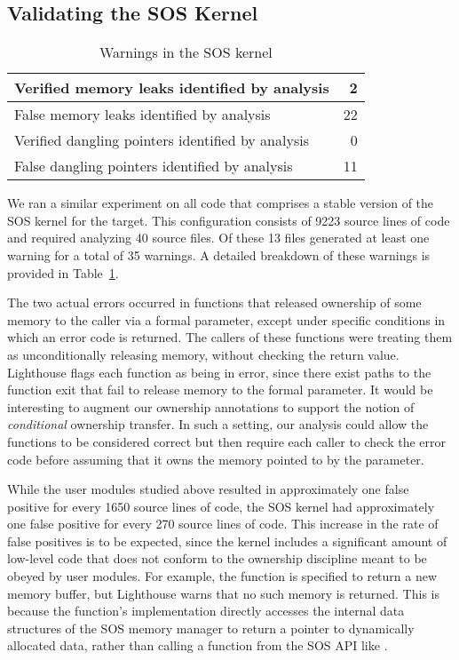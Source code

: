 \subsection{Validating the SOS Kernel}



\begin{table}
\caption{Warnings in the SOS kernel}
%
\label{tab:kernel}
\centering 
\begin{tabular}{| l | r |}
    \hline 
    Verified memory leaks identified by analysis & 2 \\
    \hline
    False memory leaks identified by analysis & 22 \\
    \hline 
    Verified dangling pointers identified by analysis & 0 \\
    \hline 
    False dangling pointers identified by analysis & 11 \\
    \hline 
\end{tabular} 
%
\end{table}


We ran a similar experiment on all code that comprises a stable version of
the SOS kernel for the  target.  
%
This configuration consists of 9223 source lines of code and required
analyzing 40 source files.  
%
Of these 13 files generated at least one warning for a total of 35
warnings.  
%
A detailed breakdown of these warnings is provided in
Table~\ref{tab:kernel}.



The two actual errors occurred in functions that released ownership of
some memory to the caller via a formal parameter, except under specific
conditions in which an error code is returned.
%
The callers of these functions were treating them as unconditionally
releasing memory, without checking the return value.  
%
Lighthouse flags each function as being in error, since there exist
paths to the function exit that fail to release memory to the formal
parameter.  
%
It would be interesting to augment our ownership annotations to support
the notion of {\em conditional} ownership transfer.  
%
In such a setting, our analysis could allow the functions to be
considered correct but then require each caller to check the error code
before assuming that it owns the memory pointed to by the parameter.




While the user modules studied above resulted in approximately one false
positive for every 1650 source lines of code, the SOS kernel had
approximately one false positive for every 270 source lines of code.  
%
This increase in the rate of false positives is to be expected, since
the kernel includes a significant amount of low-level code that does not
conform to the ownership discipline meant to be obeyed by user modules.
%
For example, the function  is specified to
return a new memory buffer,  but Lighthouse warns that no such memory is
returned.  
%
This is because the function's implementation directly accesses the
internal data structures of the SOS memory manager to return a pointer
to dynamically allocated data, rather than calling a function from the
SOS API like .


